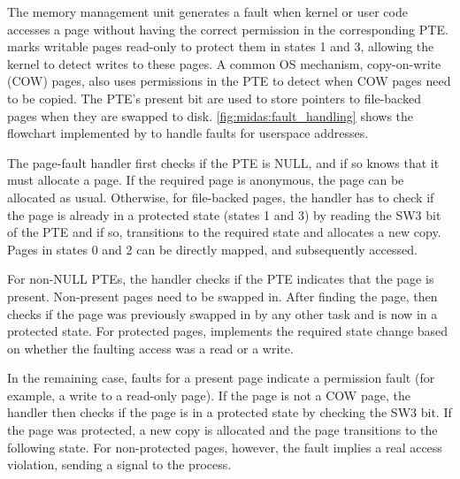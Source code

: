 The memory management unit generates a fault when kernel or user code accesses
a page without having the correct permission in the corresponding PTE.
\midas marks writable pages read-only to protect them in
states 1 and 3, allowing the kernel to detect writes to these pages.
A common OS mechanism, copy-on-write (COW) pages, also uses
permissions in the PTE to detect when COW pages need to be copied.
The PTE's present bit are used to store pointers to file-backed pages
when they are swapped to disk.
\autoref{fig:midas:fault_handling} shows the flowchart implemented by
 to handle faults for userspace addresses.

The page-fault handler first checks if the PTE is NULL, and if so
knows that it must allocate a page.
If the required page is anonymous, the page can be allocated as usual.
Otherwise, for file-backed pages, the handler has to check if the
page is already in a protected state (states 1 and 3) by reading
the SW3 bit of the PTE and if so, transitions to the required state
and allocates a new copy.
Pages in states 0 and 2 can be directly mapped, and subsequently
accessed.

For non-NULL PTEs, the handler checks if the PTE indicates that the
page is present.
Non-present pages need to be swapped in.
After finding the page, \midas then checks if the page was previously
swapped in by any other task and is now in a protected state.
For protected pages, \midas implements the required state change based
on whether the faulting access was a read or a write.

In the remaining case, faults for a present page indicate a
permission fault (for example, a write to a read-only page).
If the page is not a COW page, the handler then checks if the page
is in a protected state by checking the SW3 bit.
If the page was protected, a new copy is allocated and the page
transitions to the following state.
For non-protected pages, however, the fault implies a real access
violation, sending a signal to the process.

